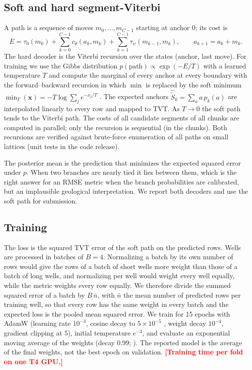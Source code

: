 \documentclass[preprint,12pt,authoryear]{elsarticle}
\newcommand{\PH}[1]{\textcolor{red}{\textbf{[#1]}}}
\newcommand{\Sl}{\tilde{S}}
\begin{document}
\subsection{Soft and hard segment-Viterbi}\label{sec:soft}
A path is a sequence of moves $m_0,\dots,m_{C-1}$ starting at anchor 0; its cost is
\begin{equation}
E = \tau_0(m_0) + \sum_{k=0}^{C-1} c_\theta(a_k,m_k) + \sum_{k=1}^{C-1}\tau_\psi(m_{k-1},m_k),\qquad a_{k+1}=a_k+m_k .
\end{equation}
The hard decoder is the Viterbi recursion over the states (anchor, last move). For training we use the Gibbs distribution $p(\text{path})\propto\exp(-E/T)$ with a learned temperature $T$ and compute the marginal of every anchor at every boundary with the forward--backward recursion in which $\min$ is replaced by the soft minimum $\min_T(\mathbf{x})=-T\log\sum_j e^{-x_j/T}$ \citep{mensch2018diffdp}. The expected anchors $\hat\Sl_k=\sum_a a\,p_k(a)$ are interpolated linearly to every row and mapped to TVT. As $T\to0$ the soft path tends to the Viterbi path. The costs of all candidate segments of all chunks are computed in parallel; only the recursion is sequential (in the chunks). Both recursions are verified against brute-force enumeration of all paths on small lattices (unit tests in the code release).

The posterior mean is the prediction that minimizes the expected squared error under $p$. When two branches are nearly tied it lies between them, which is the right answer for an RMSE metric when the branch probabilities are calibrated, but an implausible geological interpretation. We report both decoders and use the soft path for submission.

\subsection{Training}\label{sec:train}
The loss is the squared TVT error of the soft path on the predicted rows. Wells are processed in batches of $B=4$. Normalizing a batch by its own number of rows would give the rows of a batch of short wells more weight than those of a batch of long wells, and normalizing per well would weight every well equally, while the metric weights every row equally. We therefore divide the summed squared error of a batch by $B\,\bar n$, with $\bar n$ the mean number of predicted rows per training well, so that every row has the same weight in every batch and the expected loss is the pooled mean squared error. We train for 15 epochs with AdamW \citep{loshchilov2019adamw} (learning rate $10^{-3}$, cosine decay to $5\times10^{-5}$ \citep{loshchilov2017sgdr}, weight decay $10^{-4}$, gradient clipping at 5), initial temperature $e^{-3}$, and evaluate an exponential moving average of the weights (decay 0.99; \citealp{polyak1992}). The reported model is the average of the final weights, not the best epoch on validation. \PH{Training time per fold on one T4 GPU.}
\end{document}
